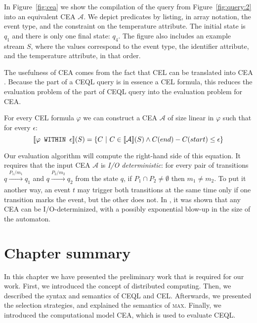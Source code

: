 \begin{example}
  In Figure~\ref{fig:cea} we show the compilation of the query from Figure~\ref{fig:query:2} into an equivalent CEA $\mathcal{A}$. We depict predicates by listing, in array notation, the event type, and the constraint on the temperature attribute. The initial state is $q_{1}$ and there is only one final state: $q_{4}$. The figure also includes an example stream $S$, where the values correspond to the event type, the identifier attribute, and the temperature attribute, in that order.
\end{example}

The usefulness of CEA comes from the fact that CEL can be translated into CEA \cite{formal-framework-cep,formal-framework-cer}. Because the  part of a CEQL query is in essence a CEL formula, this reduces the evaluation problem of the  part of CEQL query into the evaluation problem for CEA.

\begin{theorem}\label{theorem:cea}
  For every CEL formula $\varphi$ we can construct a CEA $\mathcal{A}$ of size linear in $\varphi$ such that for every $\epsilon$:
  \begin{equation*}
    \llbracket \varphi \texttt{ WITHIN } \epsilon \rrbracket(S) = \{ C \ | \ C \in \llbracket \mathcal{A} \rrbracket(S) \land C(end) - C(start) \le \epsilon \}
  \end{equation*}
\end{theorem}

Our evaluation algorithm will compute the right-hand side of this equation. It requires that the input CEA $\mathcal{A}$ is \emph{I/O deterministic}: for every pair of transitions $q \xrightarrow[]{P_{1}/m_{1}} q_{1}$ and $q \xrightarrow[]{P_{2}/m_{2}} q_{2}$ from the state $q$, if $P_{1} \cap P_{2} \ne \emptyset$ then $m_{1} \ne m_{2}$. To put it another way, an event $t$ may trigger both transitions at the same time only if one transition marks the event, but the other does not. In \cite{formal-framework-cep,formal-framework-cer}, it was shown that any CEA can be I/O-determinized, with a possibly exponential blow-up in the size of the automaton.

\section{Chapter summary}

In this chapter we have presented the preliminary work that is required for our work. First, we introduced the concept of distributed computing. Then, we described the syntax and semantics of CEQL and CEL. Afterwards, we presented the selection strategies, and explained the semantics of \textsc{max}. Finally, we introduced the computational model CEA, which is used to evaluate CEQL.
